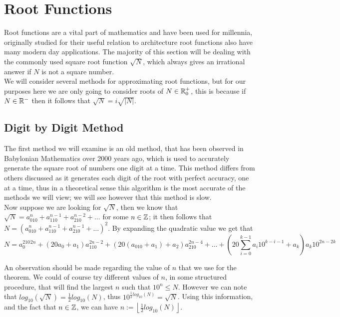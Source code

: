 \section{Root Functions}
\label{SEC_"Root Functions"}

Root functions are a vital part of mathematics and have been used for millennia, originally studied for their useful relation to architecture root functions also have many modern day applications. The majority of this section will be dealing with the commonly used square root function \(\sqrt{N}\), which always gives an irrational answer if \(N\) is not a square number.\\

We will consider several methods for approximating root functions, but for our purposes here we are only going to consider roots of \(N \in \mathbb{R}^+_0\), this is because if \(N \in \mathbb{R}^-\) then it follows that \(\sqrt{N} = i\sqrt{|N|}\).

\subsection{Digit by Digit Method}
\label{SUB_"Digit by Digit Method"}

The first method we will examine is an old method, that has been observed in Babylonian Mathematics over 2000 years ago, which is used to accurately generate the square root of numbers one digit at a time. This method differs from others discussed as it generates each digit of the root with perfect accuracy, one at a time, thus in a theoretical sense this algorithm is the most accurate of the methods we will view; we will see however that this method is slow.\\

Now suppose we are looking for \(\sqrt{N}\), then we know that \(\sqrt{N} = a_010^n + a_110^{n-1} + a_210^{n-2} + \dots\) for some \(n \in \mathbb{Z}\); it then follows that \(N = (a_010^n + a_110^{n-1} + a_210^{n-1} + \dots)^2\). By expanding the quadratic value we get that \[N = a_0^210^{2n} + (20a_0 + a_1)a_110^{2n-2} + (20(a_010 + a_1) + a_2)a_210^{2n-4} + \dots + (20\sum_{i=0}^{k-1}a_i10^{k-i-1} + a_k)a_k10^{2n - 2k}\]

An observation should be made regarding the value of \(n\) that we use for the theorem. We could of course try different values of \(n\), in some structured procedure, that will find the largest \(n\) such that \(10^n \le N\). However we can note that \(log_{10}(\sqrt{N}) = \tfrac{1}{2}log_{10}(N)\), thus \(10^{\frac{1}{2}log_{10}(N)} = \sqrt{N}\). Using this information, and the fact that \(n \in \mathbb{Z}\), we can have \(n := \left\lfloor \tfrac{1}{2}log_{10}(N) \right\rfloor\). \\

